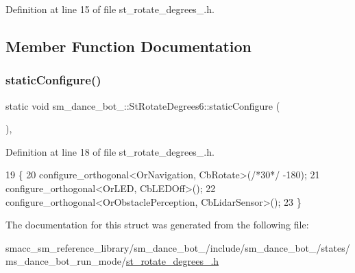 Definition at line 15 of file st\+\_\+rotate\+\_\+degrees\+\_.\+h.



\subsection{Member Function Documentation}
\mbox{\label{structsm__dance__bot__2_1_1StRotateDegrees6_a61592eedf7748d25bbb80b8cbd2851be}} 
\subsubsection{\texorpdfstring{static\+Configure()}{staticConfigure()}}
{\footnotesize\ttfamily static void sm\+\_\+dance\+\_\+bot\+\_\+::\+St\+Rotate\+Degrees6\+::static\+Configure (\begin{DoxyParamCaption}{ }\end{DoxyParamCaption})\hspace{0.3cm}{\ttfamily [inline]}, {\ttfamily [static]}}



Definition at line 18 of file st\+\_\+rotate\+\_\+degrees\+\_.\+h.


\begin{DoxyCode}
19   \{
20     configure\_orthogonal<OrNavigation, CbRotate>(\textcolor{comment}{/*30*/} -180);
21     configure\_orthogonal<OrLED, CbLEDOff>();
22     configure\_orthogonal<OrObstaclePerception, CbLidarSensor>();
23   \}
\end{DoxyCode}


The documentation for this struct was generated from the following file\+:\begin{DoxyCompactItemize}
\item 
smacc\+\_\+sm\+\_\+reference\+\_\+library/sm\+\_\+dance\+\_\+bot\+\_/include/sm\+\_\+dance\+\_\+bot\+\_/states/ms\+\_\+dance\+\_\+bot\+\_\+run\+\_\+mode/\hyperlink{2_2include_2sm__dance__bot__2_2states_2ms__dance__bot__run__mode_2st__rotate__degrees__6_8h}{st\+\_\+rotate\+\_\+degrees\+\_.\+h}\end{DoxyCompactItemize}
